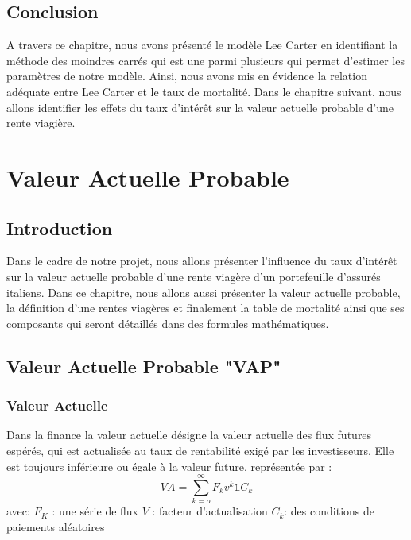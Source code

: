\documentclass[french]{report}
\begin{document}
\section{Conclusion}
A travers ce chapitre, nous avons présenté le modèle Lee Carter en identifiant la méthode des moindres carrés qui est une parmi plusieurs qui permet d'estimer les paramètres de notre modèle. Ainsi, nous avons mis en évidence la relation adéquate entre Lee Carter et le taux de mortalité.
Dans le chapitre suivant, nous allons identifier les effets du taux d'intérêt sur la valeur actuelle probable d'une rente viagière.
 

\chapter{Valeur Actuelle Probable}

\section{Introduction} 
Dans le cadre de notre projet, nous allons présenter l'influence du taux d’intérêt sur la valeur actuelle probable d’une rente viagère d’un portefeuille d’assurés italiens. Dans ce chapitre, nous allons aussi présenter la valeur actuelle probable, la définition d'une rentes viagères et finalement la table de mortalité ainsi que ses composants qui seront détaillés dans des formules mathématiques.
\section{Valeur Actuelle Probable "VAP" } 
\subsection{Valeur Actuelle}
 Dans la finance la valeur actuelle désigne la valeur actuelle des flux futures espérés, qui est actualisée au taux de rentabilité exigé par les investisseurs. Elle est toujours inférieure ou égale à la valeur future,\cite{VAP} 
\newlinet représentée par :
\newline
\newline
       \[ VA = \sum_{k=o}^{\infty}F_{k}v^{k}\mathds{1}C_{k}\]
 \newline
  avec: \newline $F_{K}$ : une série de flux  
  \newline
  $V$ : facteur d'actualisation
  \newline
  $C_{k}$: des conditions de paiements aléatoires 
\newline
\end{document}
